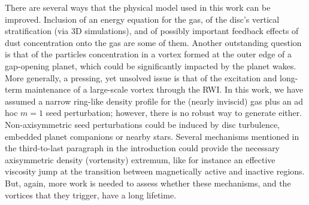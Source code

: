 \documentclass[a4paper,usenatbib]{mnras}
\begin{document}
There are several ways that the physical model used in this work can
be improved. Inclusion of an energy equation for the gas, of the
disc's vertical stratification (via 3D simulations), and of possibly
important feedback effects of dust concentration onto the gas are some
of them. Another outstanding question is that of the particles
concentration in a vortex formed at the outer edge of a gap-opening
planet, which could be significantly impacted by the planet wakes.
More generally, a pressing, yet unsolved issue is that of the
excitation and long-term maintenance of a large-scale vortex through
the RWI. In this work, we have assumed a narrow ring-like density
profile for the (nearly inviscid) gas plus an ad hoc $m=1$ seed
perturbation; however, there is no robust way to generate
either. Non-axisymmetric seed perturbations could be
induced by disc turbulence, embedded planet companions or nearby
stars. Several mechanisms mentioned in the third-to-last paragraph in
the introduction could provide the necessary axisymmetric density
(vortensity) extremum, like for instance an effective viscosity jump
at the transition between magnetically active and inactive
regions. But, again, more work is needed to assess whether these
mechanisms, and the vortices that they trigger, have a long lifetime.

\appendix

\end{document}
